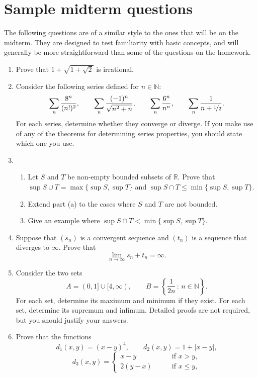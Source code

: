 \documentclass[12pt]{article}
\newcommand{\N}{\mathbb{N}}
\newcommand{\R}{\mathbb{R}}
\newcommand{\sep}{\,:\,}
\begin{document}
\section*{Sample midterm questions}
The following questions are of a similar style to the ones that will be on the
midterm. They are designed to test familiarity with basic concepts, and will
generally be more straightforward than some of the questions on the homework.
\begin{enumerate}
  \item Prove that $1+\sqrt{1+\sqrt{2}}$ is irrational.
  \item Consider the following series defined for $n \in \N$:
    \[
    \sum_n \frac{8^n}{(n!)^2}, \qquad \sum_n \frac{(-1)^n}{\sqrt{n^2+n}}, \qquad \sum_n \frac{6^n}{n^n}, \qquad \sum_n \frac{1}{n+\nicefrac{1}{2}}.
    \]
    For each series, determine whether they converge or diverge. If you make
    use of any of the theorems for determining series properties, you should
    state which one you use.
  \item
    \begin{enumerate}
      \item Let $S$ and $T$ be non-empty bounded subsets of $\R$. Prove that
	$\sup S\cup T = \max \{\sup S,\sup T\}$ and $\sup S \cap T \le \min \{
	\sup S, \sup T\}$.
      \item Extend part (a) to the cases where $S$ and $T$ are not bounded.
      \item Give an example where $\sup S \cap T < \min \{ \sup S, \sup T\}$.
    \end{enumerate}
  \item Suppose that $(s_n)$ is a convergent sequence and $(t_n)$ is a sequence
    that diverges to $\infty$. Prove that
    \[
    \lim_{n \to \infty} s_n+t_n = \infty.
    \]
  \item Consider the two sets
    \[
    A = (0,1] \cup [4,\infty), \qquad B = \left\{\frac{1}{2n} \sep n \in \N\right\}.
    \]
    For each set, determine its maximum and minimum if they exist. For
    each set, determine its supremum and infimum. Detailed proofs are
    not required, but you should justify your answers.
  \item Prove that the functions
    \[
    d_1(x,y) = (x-y)^4, \qquad d_2(x,y) = 1 + |x-y|,
    \]
    \[
    d_3(x,y)=
    \begin{cases}
      x-y & \qquad \textrm{if $x>y$,} \\
      2(y-x) & \qquad \textrm{if $x \le y,$}
    \end{cases}
\]
\end{enumerate}
\end{document}
